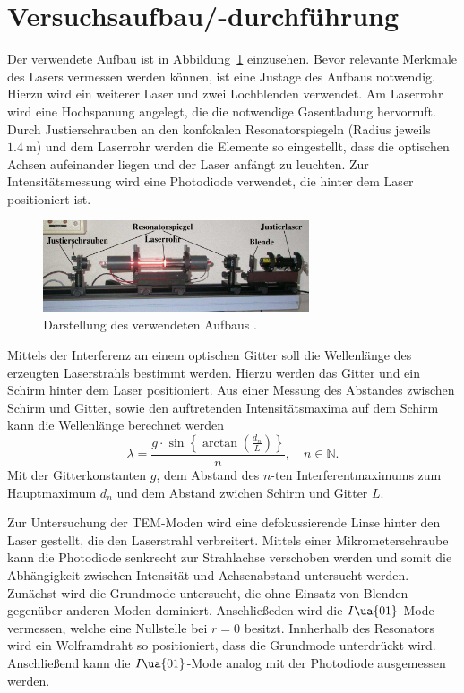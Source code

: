 \section{Versuchsaufbau/-durchführung}
Der verwendete Aufbau ist in Abbildung~\ref{fig: aufbau} einzusehen. Bevor relevante Merkmale des Lasers vermessen werden können, ist eine
Justage des Aufbaus notwendig. Hierzu wird ein weiterer Laser und zwei Lochblenden verwendet. Am Laserrohr wird eine Hochspanung
angelegt, die die notwendige Gasentladung hervorruft. Durch Justierschrauben an den konfokalen Resonatorspiegeln (Radius jeweils $\SI{1.4}{\meter}$)
und dem Laserrohr werden die Elemente so eingestellt, dass die optischen Achsen aufeinander liegen und der Laser anfängt zu leuchten.
Zur Intensitätsmessung wird eine Photodiode verwendet, die hinter dem Laser positioniert ist.
\begin{figure}
  \centering
  \includegraphics[width = 0.7\textwidth]{theorie_bilder/aufbau.png}
  \caption{Darstellung des verwendeten Aufbaus \cite{anleitung61}.}
  \label{fig: aufbau}
\end{figure}

Mittels der Interferenz an einem optischen Gitter soll die Wellenlänge des erzeugten Laserstrahls bestimmt werden. Hierzu werden das Gitter
und ein Schirm hinter dem Laser positioniert. Aus einer Messung des Abstandes zwischen Schirm und Gitter, sowie den auftretenden Intensitätsmaxima
auf dem Schirm kann die Wellenlänge berechnet werden
\begin{equation}
  \lambda = \frac{g \cdot \sin\left\{\arctan\left(\frac{d_n}{L} \right)  \right\}}{n},\quad n \in \mathbb{N}.
  \label{eq: interferenz}
\end{equation}
Mit der Gitterkonstanten $g$, dem Abstand des $n$-ten Interferentmaximums zum Hauptmaximum $d_{n}$ und dem Abstand zwichen Schirm und Gitter $L$.

Zur Untersuchung der TEM-Moden wird eine defokussierende Linse hinter den Laser gestellt, die den Laserstrahl verbreitert.
Mittels einer Mikrometerschraube kann die Photodiode
senkrecht zur Strahlachse verschoben werden und somit die Abhängigkeit zwischen Intensität und Achsenabstand untersucht werden. Zunächst
wird die Grundmode untersucht, die ohne Einsatz von Blenden gegenüber anderen Moden dominiert. Anschließeden wird die $I\ua{01}$-Mode
vermessen, welche eine Nullstelle bei $r = 0$ besitzt. Innherhalb des Resonators wird ein Wolframdraht so positioniert, dass die Grundmode
unterdrückt wird. Anschließend kann die $I\ua{01}$-Mode analog mit der Photodiode ausgemessen werden.

